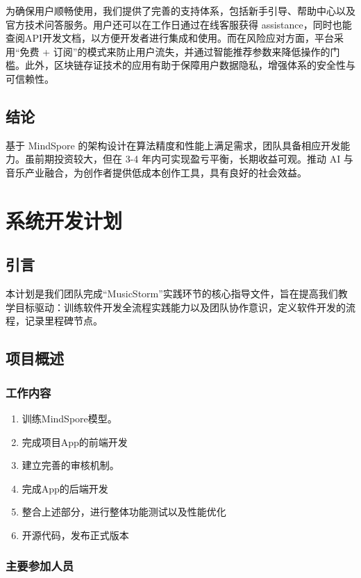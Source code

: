 \documentclass{base}
\numberwithin{figure}{section} %
\begin{document}
为确保用户顺畅使用，我们提供了完善的支持体系，包括新手引导、帮助中心以及官方技术问答服务。用户还可以在工作日通过在线客服获得 assistance，同时也能查阅API开发文档，以方便开发者进行集成和使用。而在风险应对方面，平台采用“免费 + 订阅”的模式来防止用户流失，并通过智能推荐参数来降低操作的门槛。此外，区块链存证技术的应用有助于保障用户数据隐私，增强体系的安全性与可信赖性。

\subsection{结论}

基于 MindSpore 的架构设计在算法精度和性能上满足需求，团队具备相应开发能力。虽前期投资较大，但在 3-4 年内可实现盈亏平衡，长期收益可观。推动 AI 与音乐产业融合，为创作者提供低成本创作工具，具有良好的社会效益。 
\newpage

\section{系统开发计划}

\subsection{引言}

本计划是我们团队完成“MusicStorm”实践环节的核心指导文件，旨在提高我们教学目标驱动：训练软件开发全流程实践能力以及团队协作意识​，定义软件开发的流程，记录里程碑节点。

\subsection{项目概述}

\subsubsection{工作内容}

\begin{enumerate}
    \item 训练MindSpore模型。
    \item 完成项目App的前端开发
    \item 建立完善的审核机制。
    \item 完成App的后端开发
    \item 整合上述部分，进行整体功能测试以及性能优化
    \item 开源代码，发布正式版本
\end{enumerate}

\subsubsection{主要参加人员}
\end{document}
